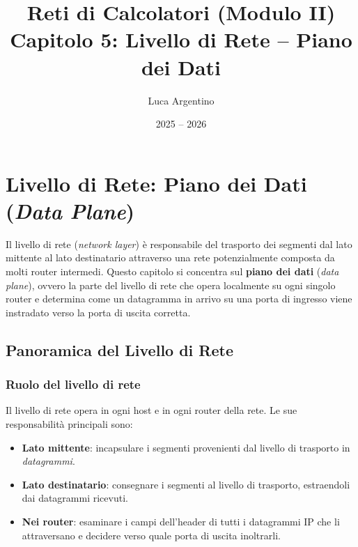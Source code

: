 \documentclass[a4paper,12pt]{report}
\title{Reti di Calcolatori (Modulo II) \\ Capitolo 5: Livello di Rete -- Piano dei Dati}
\author{Luca Argentino}
\date{2025 -- 2026}
\begin{document}
\maketitle
\tableofcontents
\newpage

\setcounter{chapter}{4}

\chapter{Livello di Rete: Piano dei Dati (\textit{Data Plane})}

Il livello di rete (\textit{network layer}) è responsabile del trasporto dei segmenti dal lato mittente al lato destinatario attraverso una rete potenzialmente composta da molti router intermedi. Questo capitolo si concentra sul \textbf{piano dei dati} (\textit{data plane}), ovvero la parte del livello di rete che opera localmente su ogni singolo router e determina come un datagramma in arrivo su una porta di ingresso viene instradato verso la porta di uscita corretta.

\section{Panoramica del Livello di Rete}

\subsection{Ruolo del livello di rete}

Il livello di rete opera in ogni host e in ogni router della rete. Le sue responsabilità principali sono:

\begin{itemize}
    \item \textbf{Lato mittente}: incapsulare i segmenti provenienti dal livello di trasporto in \textit{datagrammi}.
    \item \textbf{Lato destinatario}: consegnare i segmenti al livello di trasporto, estraendoli dai datagrammi ricevuti.
    \item \textbf{Nei router}: esaminare i campi dell'header di tutti i datagrammi IP che li attraversano e decidere verso quale porta di uscita inoltrarli.
\end{itemize}
\end{document}
